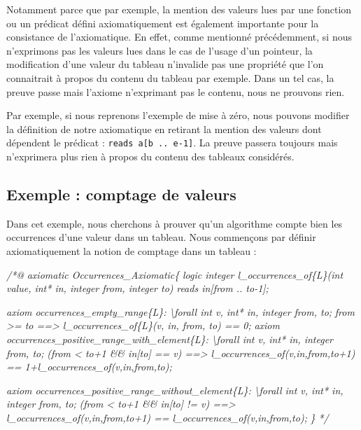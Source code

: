 \documentclass[12pt,francais,]{scrbook}
\newenvironment{Shaded}{}{}
\newcommand{\CommentTok}[1]{\textcolor[rgb]{0.38,0.63,0.69}{\textit{{#1}}}}
\begin{document}
Notamment parce que par exemple, la mention des valeurs lues par une
fonction ou un prédicat défini axiomatiquement est également importante
pour la consistance de l'axiomatique. En effet, comme mentionné
précédemment, si nous n'exprimons pas les valeurs lues dans le cas de
l'usage d'un pointeur, la modification d'une valeur du tableau
n'invalide pas une propriété que l'on connaitrait à propos du contenu du
tableau par exemple. Dans un tel cas, la preuve passe mais l'axiome
n'exprimant pas le contenu, nous ne prouvons rien.

Par exemple, si nous reprenons l'exemple de mise à zéro, nous pouvons
modifier la définition de notre axiomatique en retirant la mention des
valeurs dont dépendent le prédicat : \texttt{reads\ a{[}b\ ..\ e-1{]}}.
La preuve passera toujours mais n'exprimera plus rien à propos du
contenu des tableaux considérés.

\subsection{Exemple : comptage de
valeurs}\label{exemple-comptage-de-valeurs}

Dans cet exemple, nous cherchons à prouver qu'un algorithme compte bien
les occurrences d'une valeur dans un tableau. Nous commençons par
définir axiomatiquement la notion de comptage dans un tableau :

\begin{footnotesize}\begin{Shaded}
\begin{Highlighting}[]
\CommentTok{/*@}
\CommentTok{  axiomatic Occurrences_Axiomatic\{}
\CommentTok{    logic integer l_occurrences_of\{L\}(int value, int* in, integer from, integer to)}
\CommentTok{      reads in[from .. to-1];}

\CommentTok{    axiom occurrences_empty_range\{L\}:}
\CommentTok{      \textbackslash{}forall int v, int* in, integer from, to;}
\CommentTok{        from >= to ==> l_occurrences_of\{L\}(v, in, from, to) == 0;}
\CommentTok{    }
\CommentTok{    axiom occurrences_positive_range_with_element\{L\}:}
\CommentTok{      \textbackslash{}forall int v, int* in, integer from, to;}
\CommentTok{        (from < to+1 && in[to] == v) ==>}
\CommentTok{      l_occurrences_of(v,in,from,to+1) == 1+l_occurrences_of(v,in,from,to);}

\CommentTok{    axiom occurrences_positive_range_without_element\{L\}:}
\CommentTok{      \textbackslash{}forall int v, int* in, integer from, to;}
\CommentTok{        (from < to+1 && in[to] != v) ==>}
\CommentTok{      l_occurrences_of(v,in,from,to+1) == l_occurrences_of(v,in,from,to);}
\CommentTok{  \}}
\CommentTok{*/}
\end{Highlighting}
\end{Shaded}\end{footnotesize}
\end{document}
